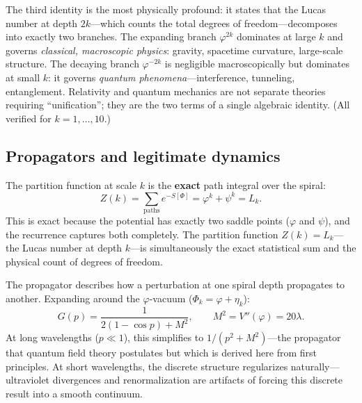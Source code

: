 \documentclass[12pt,a4paper]{article}
\begin{document}
The third identity is the most physically profound: it states that the Lucas number at depth $2k$---which counts the total degrees of freedom---decomposes into exactly two branches. The expanding branch $\varphi^{2k}$ dominates at large $k$ and governs \emph{classical, macroscopic physics}: gravity, spacetime curvature, large-scale structure. The decaying branch $\varphi^{-2k}$ is negligible macroscopically but dominates at small $k$: it governs \emph{quantum phenomena}---interference, tunneling, entanglement. Relativity and quantum mechanics are not separate theories requiring ``unification''; they are the two terms of a single algebraic identity. (All verified for $k = 1, \ldots, 10$.)

\subsection{Propagators and legitimate dynamics}

The partition function at scale $k$ is the \textbf{exact} path integral over the spiral:
\begin{equation}
Z(k) = \sum_{\text{paths}} e^{-S[\Phi]} = \varphi^k + \psi^k = L_k.
\end{equation}
This is exact because the potential has exactly two saddle points ($\varphi$ and $\psi$), and the recurrence captures both completely. The partition function $Z(k) = L_k$---the Lucas number at depth $k$---is simultaneously the exact statistical sum and the physical count of degrees of freedom.

The propagator describes how a perturbation at one spiral depth propagates to another. Expanding around the $\varphi$-vacuum ($\Phi_k = \varphi + \eta_k$):
\begin{equation}
G(p) = \frac{1}{2(1 - \cos p) + M^2}, \qquad M^2 = V''(\varphi) = 20\lambda.
\end{equation}
At long wavelengths ($p \ll 1$), this simplifies to $1/(p^2 + M^2)$---the propagator that quantum field theory postulates but which is derived here from first principles. At short wavelengths, the discrete structure regularizes naturally---ultraviolet divergences and renormalization are artifacts of forcing this discrete result into a smooth continuum.
\end{document}
